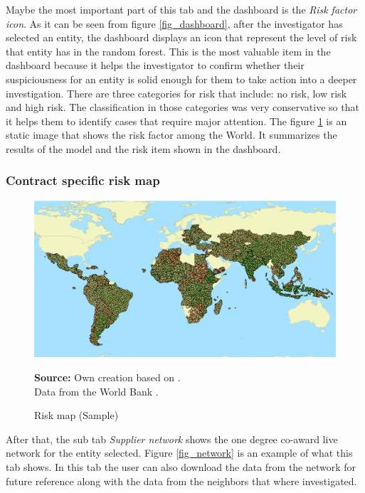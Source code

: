 Maybe the most important part of this tab and the dashboard is the \textit{Risk factor icon}. As it can be seen from figure \ref{fig_dashboard}, after the investigator has selected an entity, the dashboard displays an icon that represent the level of risk that entity has in the random forest. This is the most valuable item in the dashboard because it helps the investigator to confirm whether their suspiciousness for an entity is solid enough for them to take action into a deeper investigation. There are three categories for risk that include: no risk, low risk and high risk. The classification in those categories was very conservative so that it helps them to identify cases that require major attention. The figure \ref{fig_risk_map} is an static image that shows the risk factor among the World. It summarizes the results of the model and the risk item shown in the dashboard.

\subsubsection{Contract specific risk map}

\begin{figure}[H]
\begin{center}
\caption{Risk map (Sample)}
\label{fig_risk_map}
\includegraphics[width=\textwidth,height=1\textheight,keepaspectratio]{../img/risk_map.pdf}
\end{center}
\noindent \footnotesize{\textbf{Source:} Own creation based on \cite{wb_i_map}. \\Data from the World Bank \parencite{wb_data}.}
\end{figure}



After that, the sub tab \textit{Supplier network} shows the one degree co-award live network for the entity selected. Figure \ref{fig_network} is an example of what this tab shows. In this tab the user can also download the data from the network for future reference along with the data from the neighbors that where investigated.

